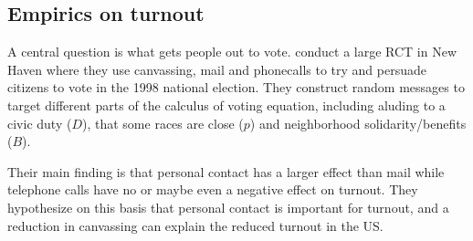 \subsection{Empirics on turnout \citep{gerber_effects_2000}}
A central question is what gets people out to vote. \citeauthor{gerber_effects_2000} conduct a large RCT in New Haven where they use canvassing, mail and phonecalls to try and persuade citizens to vote in the 1998 national election. They construct random messages to target different parts of the calculus of voting equation, including aluding to a civic duty ($D$), that some races are close ($p$) and neighborhood solidarity/benefits ($B$).

Their main finding is that personal contact has a larger effect than mail while telephone calls have no or maybe even a negative effect on turnout. They hypothesize on this basis that personal contact is important for turnout, and a reduction in canvassing can explain the reduced turnout in the US.